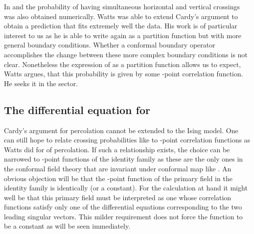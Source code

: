 \documentclass[a4paper,12pt]{article}
\begin{document}
In \cite{LPPS} and \cite{LPS} the probability \coordHE{} of having simultaneous
horizontal and vertical crossings was also obtained numerically. Watts \cite{W} was
able to extend Cardy's argument to obtain a prediction that fits extremely well
the data. His work is of particular interest to us as he is able to write
\coordHE{} again as a partition function but with more general boundary
conditions. Whether a conformal boundary operator accomplishes
the change between these more complex boundary conditions is not clear.
Nonetheless the expression of \coordHE{} as a partition function allows
us to expect, Watts argues, that this probability is given by some
\coordHE{}-point correlation function. He seeks it in the \coordHE{} sector.

\subsection{The differential equation for \coordHE{}}

Cardy's argument for percolation cannot be extended to the Ising model.
One can still hope to relate crossing probabilities like \coordHE{} to
\coordHE{}-point correlation functions as Watts did for \coordHE{} of percolation.
If such a relationship exists, the choice can be narrowed to \coordHE{}-point
functions of the identity family as these are the only ones in the
\coordHE{} conformal field theory that are invariant under conformal
map \coordHE{} like \coordHE{}. An obvious objection will be
that the \coordHE{}-point function of the primary field in the identity family
is identically \coordHE{} (or a constant). For the calculation at hand it might well be
that this primary field must be interpreted as one whose 
correlation functions satisfy only one of the differential equations
corresponding to the two leading singular vectors. This milder 
requirement does not force the function to be a constant as will be seen
immediately.
\end{document}
